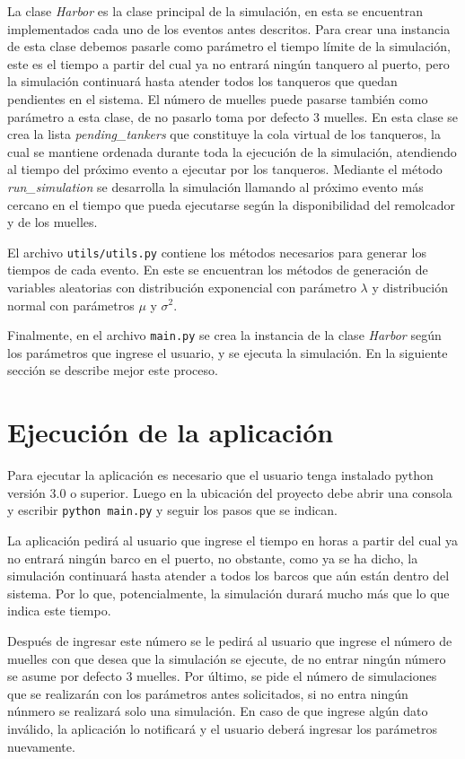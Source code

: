 \documentclass[twoside]{article}
\begin{document}
La clase \textit{Harbor} es la clase principal de la simulaci\'on, en esta se encuentran implementados cada uno de los eventos antes descritos. Para crear una instancia de esta clase debemos pasarle como par\'ametro el tiempo l\'imite de la simulaci\'on, este es el tiempo a partir del cual ya no entrar\'a ning\'un tanquero al puerto, pero la simulaci\'on continuar\'a hasta atender todos los tanqueros que quedan pendientes en el sistema. El n\'umero de muelles puede pasarse tambi\'en como par\'ametro a esta clase, de no pasarlo toma por defecto $3$ muelles. En esta clase se crea la lista \textit{pending\_tankers} que constituye la cola virtual de los tanqueros, la cual se mantiene ordenada durante toda la ejecuci\'on de la simulaci\'on, atendiendo al tiempo del pr\'oximo evento a ejecutar por los tanqueros. Mediante el m\'etodo \textit{run\_simulation} se desarrolla la simulaci\'on llamando al pr\'oximo evento m\'as cercano en el tiempo que pueda ejecutarse seg\'un la disponibilidad del remolcador y de los muelles.

El archivo \texttt{utils/utils.py} contiene los m\'etodos necesarios para generar los tiempos de cada evento. En este se encuentran los m\'etodos de generaci\'on de variables aleatorias con distribuci\'on exponencial con par\'ametro $\lambda$ y distribuci\'on normal con par\'ametros $\mu$ y $\sigma^2$.

Finalmente, en el archivo \texttt{main.py} se crea la instancia de la clase \textit{Harbor} seg\'un los par\'ametros que ingrese el usuario, y se ejecuta la simulaci\'on. En la siguiente secci\'on se describe mejor este proceso.

\section{Ejecuci\'on de la aplicaci\'on}
Para ejecutar la aplicaci\'on es necesario que el usuario tenga instalado python versi\'on $3.0$ o superior. Luego en la ubicaci\'on del proyecto debe abrir una consola y escribir \texttt{python main.py} y seguir los pasos que se indican.

La aplicaci\'on pedir\'a al usuario que ingrese el tiempo en horas a partir del cual ya no entrar\'a ning\'un barco en el puerto, no obstante, como ya se ha dicho, la simulaci\'on continuar\'a hasta atender a todos los barcos que a\'un est\'an dentro del sistema. Por lo que, potencialmente, la simulaci\'on durar\'a mucho m\'as que lo que indica este tiempo.

Despu\'es de ingresar este n\'umero se le pedir\'a al usuario que ingrese el n\'umero de muelles con que desea que la simulaci\'on se ejecute, de no entrar ning\'un n\'umero se asume por defecto $3$ muelles. Por \'ultimo, se pide el n\'umero de simulaciones que se realizar\'an con los par\'ametros antes solicitados, si no entra ning\'un n\'unmero se realizar\'a solo una simulaci\'on. En caso de que ingrese alg\'un dato inv\'alido, la aplicaci\'on lo notificar\'a y el usuario deber\'a ingresar los par\'ametros nuevamente.
\end{document}
